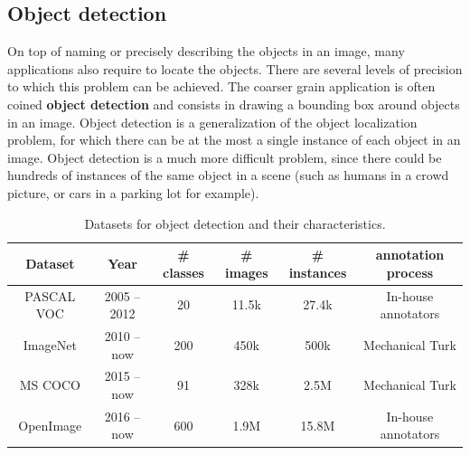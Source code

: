 \subsection{Object detection}

On top of naming or precisely describing the objects in an image,
many applications also require to locate the objects.
There are several levels of precision to which this problem can be achieved.
The coarser grain application is often coined \textbf{object detection}
and consists in drawing a bounding box around objects in an image.
Object detection is a generalization of the object localization problem,
for which there can be at the most a single instance of each object in an image.
Object detection is a much more difficult problem,
since there could be hundreds of instances of the same object in a scene
(such as humans in a crowd picture, or cars in a parking lot for example).

\vspace{0.5cm}
\begin{table}
	\centering
	\caption{Datasets for object detection and their characteristics.}
	\begin{tabular}{|c|c|c|c|c|c|}
		\hline
		Dataset & Year & \# classes & \# images & \# instances & annotation process \\
		\hline
		PASCAL VOC \cite{Everingham10} & 2005 -- 2012 & 20 & 11.5k & 27.4k & In-house annotators \\
		ImageNet\cite{ILSVRC15} & 2010 -- now & 200 & 450k & 500k & Mechanical Turk \\
		MS COCO \cite{lin2014microsoft} & 2015 -- now & 91 & 328k & 2.5M & Mechanical Turk \\
		OpenImage \cite{OpenImages, OpenImages2} & 2016 -- now & 600 & 1.9M & 15.8M & In-house annotators \\
		\hline
	\end{tabular}
	\label{tab:detection_ds}
\end{table}

